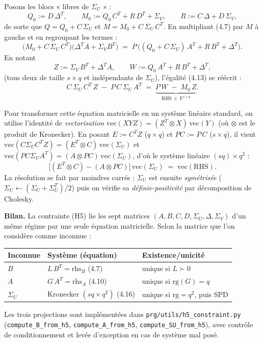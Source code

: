 \documentclass[12pt, a4paper]{article}
\begin{document}
{\noindent Posons les blocs « libres de $\Sigma_U$ » :
\begin{equation}
  Q_0 := D\,\Delta^T,                  \qquad
  M_0 := Q_0\,C^T + R\,D^T + \Sigma_V, \qquad
  R   := C\,\Delta + D\,\Sigma_V,
  \tag{4.12}
\end{equation}
de sorte que $Q = Q_0 + C\,\Sigma_U$ et $M = M_0 + C\,\Sigma_U\,C^T$. En multipliant
(4.7) par $M$ à gauche et en regroupant les termes :
\begin{equation}
  \bigl(M_0 + C\,\Sigma_U\,C^T\bigr)\bigl(\Delta^T A + \Sigma_V B^T\bigr)
  \;=\; P\,\bigl((Q_0 + C\,\Sigma_U)\,A^T + R\,B^T + \Delta^T\bigr).
  \tag{4.13}
\end{equation}
En notant
\begin{equation}
  Z := \Sigma_V\,B^T + \Delta^T A,    \qquad
  W := Q_0\,A^T + R\,B^T + \Delta^T,
  \tag{4.14}
\end{equation}
(tous deux de taille $s \times q$ et indépendants de $\Sigma_U$), l'égalité (4.13) se
réécrit :
\begin{equation}
  C\,\Sigma_U\,C^T\,Z \;-\; P\,C\,\Sigma_U\,A^T
  \;=\; \underbrace{P\,W \;-\; M_0\,Z}_{\displaystyle \mathrm{RHS}\,\in\,\mathbb{R}^{s\times q}}.
  \tag{4.15}
\end{equation}

\noindent Pour transformer cette équation matricielle en un système linéaire standard, on
utilise l'identité de \emph{vectorisation}
$\mathrm{vec}(XYZ) = (Z^T \otimes X)\,\mathrm{vec}(Y)$ (où $\otimes$ est le produit de
Kronecker). En posant $E := C^T Z$ ($q \times q$) et $PC := P\,C$ ($s \times q$), il vient
$\mathrm{vec}(C \Sigma_U C^T Z) = (E^T \otimes C)\,\mathrm{vec}(\Sigma_U)$ et
$\mathrm{vec}(P C \Sigma_U A^T) = (A \otimes PC)\,\mathrm{vec}(\Sigma_U)$, d'où le
système linéaire $(sq) \times q^2$ :
\begin{equation}
  \boxed{\bigl[(E^T \otimes C) - (A \otimes PC)\bigr]\,\mathrm{vec}(\Sigma_U)
  \;=\; \mathrm{vec}(\mathrm{RHS}).}
  \tag{4.16}
\end{equation}
La résolution se fait par moindres carrés ; $\Sigma_U$ est ensuite \emph{symétrisée}
($\Sigma_U \leftarrow (\Sigma_U + \Sigma_U^T)/2$) puis on vérifie sa
\emph{définie-positivité} par décomposition de Cholesky.

\medskip
\noindent\textbf{Bilan.} La contrainte (H5) lie les sept matrices $(A, B, C, D, \Sigma_U,
\Delta, \Sigma_V)$ d'un même régime par une seule équation matricielle. Selon la matrice
que l'on considère comme inconnue :
\begin{center}
\begin{tabular}{@{}lll@{}}
  \textbf{Inconnue} & \textbf{Système (équation)} & \textbf{Existence/unicité} \\ \hline
  $B$       & $L\,B^T = \mathrm{rhs}_B$        \quad (4.7)  & unique si $L \succ 0$ \\
  $A$       & $G\,A^T = \mathrm{rhs}_A$        \quad (4.10) & unique si $\mathrm{rg}(G) = q$ \\
  $\Sigma_U$ & Kronecker $(sq \times q^2)$    \quad (4.16) & unique si $\mathrm{rg} = q^2$, puis SPD \\
\end{tabular}
\end{center}

Les trois projections sont implémentées dans \texttt{prg/utils/h5\_constraint.py}
(\texttt{compute\_B\_from\_h5}, \texttt{compute\_A\_from\_h5},
\texttt{compute\_SU\_from\_h5}), avec contrôle de conditionnement et levée d'exception
en cas de système mal posé.

}%
\end{document}
